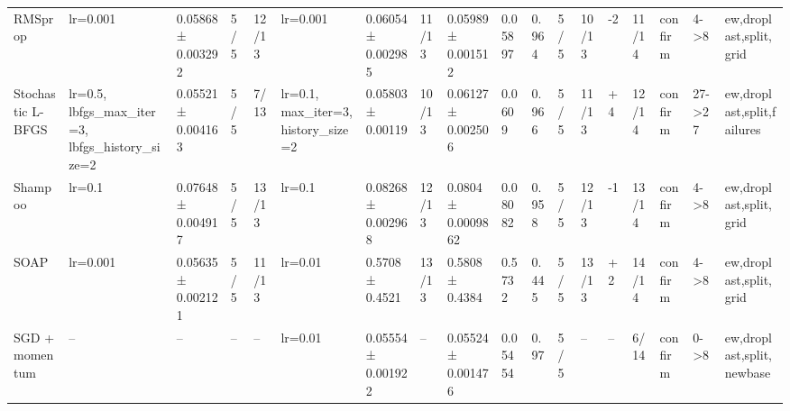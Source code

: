 \begin{tabular}{llllllllllllllllll}
RMSprop & lr=0.001 & 0.05868 ± 0.003292 & 5/5 & 12/13 & lr=0.001 & 0.06054 ± 0.002985 & 11/13 & 0.05989 ± 0.001512 & 0.05897 & 0.964 & 5/5 & 10/13 & -2 & 11/14 & confirm & 4->8 & ew,droplast,split,grid \\
Stochastic L-BFGS & lr=0.5, lbfgs\_max\_iter=3, lbfgs\_history\_size=2 & 0.05521 ± 0.004163 & 5/5 & 7/13 & lr=0.1, max\_iter=3, history\_size=2 & 0.05803 ± 0.00119 & 10/13 & 0.06127 ± 0.002506 & 0.0609 & 0.966 & 5/5 & 11/13 & +4 & 12/14 & confirm & 27->27 & ew,droplast,split,failures \\
Shampoo & lr=0.1 & 0.07648 ± 0.004917 & 5/5 & 13/13 & lr=0.1 & 0.08268 ± 0.002968 & 12/13 & 0.0804 ± 0.0009862 & 0.08082 & 0.958 & 5/5 & 12/13 & -1 & 13/14 & confirm & 4->8 & ew,droplast,split,grid \\
SOAP & lr=0.001 & 0.05635 ± 0.002121 & 5/5 & 11/13 & lr=0.01 & 0.5708 ± 0.4521 & 13/13 & 0.5808 ± 0.4384 & 0.5732 & 0.445 & 5/5 & 13/13 & +2 & 14/14 & confirm & 4->8 & ew,droplast,split,grid \\
SGD + momentum & -- & -- & -- & -- & lr=0.01 & 0.05554 ± 0.001922 & -- & 0.05524 ± 0.001476 & 0.05454 & 0.97 & 5/5 & -- & -- & 6/14 & confirm & 0->8 & ew,droplast,split,newbase \\
\bottomrule
\end{tabular}
